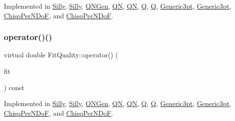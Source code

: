 Implemented in \mbox{\hyperlink{classSilly_a090ed776bc4cf29f2ad8802242090b59}{Silly}}, \mbox{\hyperlink{classSilly_a090ed776bc4cf29f2ad8802242090b59}{Silly}}, \mbox{\hyperlink{classQNGen_a9fcf4cc02a027c054a889421898175fa}{Q\+N\+Gen}}, \mbox{\hyperlink{classQN_ad80e962cb22f614fd9946e5cf1432e19}{QN}}, \mbox{\hyperlink{classQN_ad80e962cb22f614fd9946e5cf1432e19}{QN}}, \mbox{\hyperlink{classQ_a31d9d5bc680b063c2f80238795c7a6c0}{Q}}, \mbox{\hyperlink{classQ_a31d9d5bc680b063c2f80238795c7a6c0}{Q}}, \mbox{\hyperlink{classGeneric3pt_a669b462af539bd13514447ed387f0644}{Generic3pt}}, \mbox{\hyperlink{classGeneric3pt_a669b462af539bd13514447ed387f0644}{Generic3pt}}, \mbox{\hyperlink{classChisqPerNDoF_a69870fb2d2f84fa15665bbc384cb1cf7}{Chisq\+Per\+N\+DoF}}, and \mbox{\hyperlink{classChisqPerNDoF_a69870fb2d2f84fa15665bbc384cb1cf7}{Chisq\+Per\+N\+DoF}}.

\mbox{\label{classFitQuality_a49a49e1206709d71c3ead41e981bb848}} 
\subsubsection{\texorpdfstring{operator()()}{operator()()}\hspace{0.1cm}{\footnotesize\ttfamily [1/2]}}
{\footnotesize\ttfamily virtual double Fit\+Quality\+::operator() (\begin{DoxyParamCaption}\item[{const \mbox{\hyperlink{classAvgFit}{Avg\+Fit}} \&}]{fit }\end{DoxyParamCaption}) const\hspace{0.3cm}{\ttfamily [pure virtual]}}



Implemented in \mbox{\hyperlink{classSilly_a7da4b46c49f85b3dbf91bbdcd7299b2c}{Silly}}, \mbox{\hyperlink{classSilly_a7da4b46c49f85b3dbf91bbdcd7299b2c}{Silly}}, \mbox{\hyperlink{classQNGen_a318c2cf305ceb9e81bef665364686408}{Q\+N\+Gen}}, \mbox{\hyperlink{classQN_a3328fcfb7a093b9e843cd0da56bf09f3}{QN}}, \mbox{\hyperlink{classQN_a3328fcfb7a093b9e843cd0da56bf09f3}{QN}}, \mbox{\hyperlink{classQ_a783778170d5dbec7517dbe5c6f00a3c3}{Q}}, \mbox{\hyperlink{classQ_a783778170d5dbec7517dbe5c6f00a3c3}{Q}}, \mbox{\hyperlink{classGeneric3pt_ae10e73d761543be321a101ce1e57b49e}{Generic3pt}}, \mbox{\hyperlink{classGeneric3pt_ae10e73d761543be321a101ce1e57b49e}{Generic3pt}}, \mbox{\hyperlink{classChisqPerNDoF_a4d45c53a895115c4fe318d22c44228e4}{Chisq\+Per\+N\+DoF}}, and \mbox{\hyperlink{classChisqPerNDoF_a4d45c53a895115c4fe318d22c44228e4}{Chisq\+Per\+N\+DoF}}.

